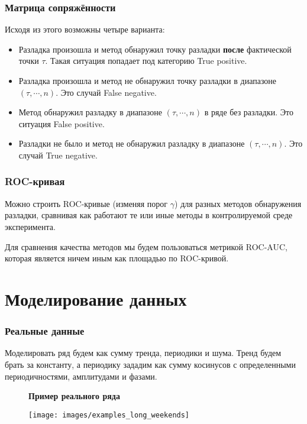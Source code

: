 \documentclass[intlimits, 9pt, unicode]{beamer}
\begin{document}
\begin{frame}
    \frametitle{Матрица сопряжённости}

Исходя из этого возможны четыре варианта:
\begin{itemize}
	\item Разладка произошла и метод обнаружил точку разладки \textbf{после} фактической точки $\tau$. Такая ситуация попадает под категорию True positive.
	\item Разладка произошла и метод не обнаружил точку разладки в диапазоне $(\tau, \cdots, n)$. Это случай False negative.
	\item Метод обнаружил разладку в диапазоне $(\tau, \cdots, n)$ в ряде без разладки. Это ситуация False positive.
	\item Разладки не было и метод не обнаружил разладку в диапазоне $(\tau, \cdots, n)$. Это случай True negative.
\end{itemize}

\end{frame}


\begin{frame}
    \frametitle{ROC-кривая}

Можно строить ROC-кривые (изменяя порог $\gamma$) для разных методов обнаружения разладки, сравнивая как работают те или иные методы в контролируемой среде эксперимента. 

Для сравнения качества методов мы будем пользоваться метрикой ROC-AUC, которая является ничем иным как площадью по ROC-кривой. 

\end{frame}

\section{Моделирование данных}

\begin{frame}
\frametitle{Реальные данные}

Моделировать ряд будем как сумму тренда, периодики и шума. Тренд будем брать за константу, а периодику зададим как сумму косинусов с определенными периодичностями, амплитудами и фазами.

\begin{figure}
\textbf{Пример реального ряда}\par\medskip
\texttt{[image: images/examples\_long\_weekends]}
\end{figure}
\end{frame}
\end{document}
